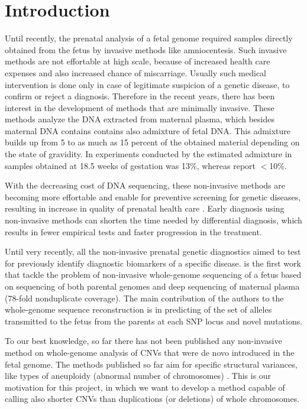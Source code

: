\section{Introduction}

Until recently, the prenatal analysis of a fetal genome required samples directly obtained from the fetus by invasive methods like amniocentesis. Such invasive methods are not effortable at high scale, because of increased health care expenses and also increased chance of miscarriage. Usually such medical intervention is done only in case of legitimate suspicion of a genetic disease, to confirm or reject a diagnosis. Therefore in the recent years, there has been interest in the development of methods that are minimally invasive. These methods analyze the DNA extracted from maternal plasma, which besides maternal DNA contains contains also admixture of fetal DNA. This admixture builds up from 5 to as much as 15 percent of the obtained material depending on the state of gravidity. In experiments conducted by \cite{kitzman2012} the estimated admixture in samples obtained at 18.5 weeks of gestation was 13\%, whereas \cite{bauer2006} report $<$10\%.

With the decreasing cost of DNA sequencing, these non-invasive methods are becoming more effortable and enable for preventive screening for genetic diseases, resulting in increase in quality of prenatal health care \cite{saunders2012}. Early diagnosis using non-invasive methods can shorten the time needed by differential diagnosis, which results in fewer empirical tests and faster progression in the treatment.

Until very recently, all the non-invasive prenatal genetic diagnostics aimed to test for previously identify diagnostic biomarkers of a specific disease. \cite{kitzman2012} is the first work that tackle the problem of non-invasive whole-genome sequencing of a fetus based on sequencing of both parental genomes and deep sequencing of maternal plasma (78-fold nonduplicate coverage). The main contribution of the authors to the whole-genome sequence reconstruction is in predicting of the set of alleles transmitted to the fetus from the parents at each SNP locus and novel mutations. 

To our best knowledge, so far there has not been published any non-invasive method on whole-genome analysis of CNVs that were de novo introduced in the fetal genome. The methods published so far aim for specific structural variances, like types of aneuploidy (abnormal number of chromosomes) \cite{chu2009}. This is our motivation for this project, in which we want to develop a method capable of calling also shorter CNVs than duplications (or deletions) of whole chromosomes.

